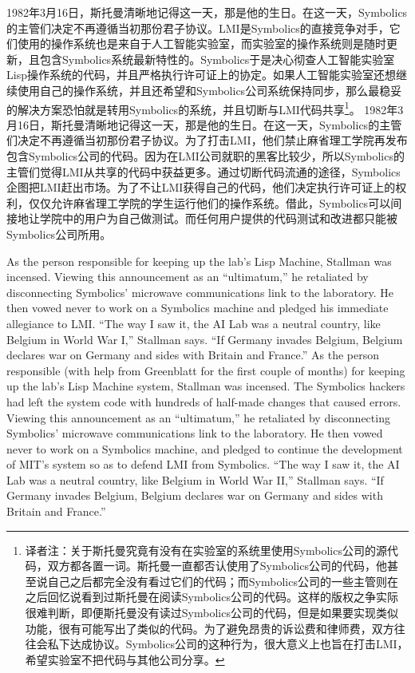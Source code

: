 \ifdefined\chs
\ifdefined\vone
1982年3月16日，斯托曼清晰地记得这一天，那是他的生日。在这一天，Symbolics的主管们决定不再遵循当初那份君子协议。LMI是Symbolics的直接竞争对手，它们使用的操作系统也是来自于人工智能实验室，而实验室的操作系统则是随时更新，且包含Symbolics系统最新特性的。Symbolics于是决心彻查人工智能实验室Lisp操作系统的代码，并且严格执行许可证上的协定。如果人工智能实验室还想继续使用自己的操作系统，并且还希望和Symbolics公司系统保持同步，那么最稳妥的解决方案恐怕就是转用Symbolics的系统，并且切断与LMI代码共享\footnote{译者注：关于斯托曼究竟有没有在实验室的系统里使用Symbolics公司的源代码，双方都各置一词。斯托曼一直都否认使用了Symbolics公司的代码，他甚至说自己之后都完全没有看过它们的代码；而Symbolics公司的一些主管则在之后回忆说看到过斯托曼在阅读Symbolics公司的代码。这样的版权之争实际很难判断，即便斯托曼没有读过Symbolics公司的代码，但是如果要实现类似功能，很有可能写出了类似的代码。为了避免昂贵的诉讼费和律师费，双方往往会私下达成协议。Symbolics公司的这种行为，很大意义上也旨在打击LMI，希望实验室不把代码与其他公司分享。}。
\fi
\ifdefined\vtwo
1982年3月16日，斯托曼清晰地记得这一天，那是他的生日。在这一天，Symbolics的主管们决定不再遵循当初那份君子协议。为了打击LMI，他们禁止麻省理工学院再发布包含Symbolics公司的代码。因为在LMI公司就职的黑客比较少，所以Symbolics的主管们觉得LMI从共享的代码中获益更多。通过切断代码流通的途径，Symbolics企图把LMI赶出市场。为了不让LMI获得自己的代码，他们决定执行许可证上的权利，仅仅允许麻省理工学院的学生运行他们的操作系统。借此，Symbolics可以间接地让学院中的用户为自己做测试。而任何用户提供的代码测试和改进都只能被Symbolics公司所用。
\fi
\fi

\ifdefined\eng
\ifdefined\vone
As the person responsible for keeping up the lab's Lisp Machine, Stallman was incensed. Viewing this announcement as an ``ultimatum,'' he retaliated by disconnecting Symbolics' microwave communications link to the laboratory. He then vowed never to work on a Symbolics machine and pledged his immediate allegiance to LMI. ``The way I saw it, the AI Lab was a neutral country, like Belgium in World War I,'' Stallman says. ``If Germany invades Belgium, Belgium declares war on Germany and sides with Britain and France.''
\fi
\ifdefined\vtwo
As the person responsible (with help from Greenblatt for the first couple of months) for keeping up the lab's Lisp Machine system, Stallman was incensed. The Symbolics hackers had left the system code with hundreds of half-made changes that caused errors. Viewing this announcement as an ``ultimatum,'' he retaliated by disconnecting Symbolics' microwave communications link to the laboratory. He then vowed never to work on a Symbolics machine, and pledged to continue the development of MIT's system so as to defend LMI from Symbolics. ``The way I saw it, the AI Lab was a neutral country, like Belgium in World War II,'' Stallman says. ``If Germany invades Belgium, Belgium declares war on Germany and sides with Britain and France.''
\fi
\fi

